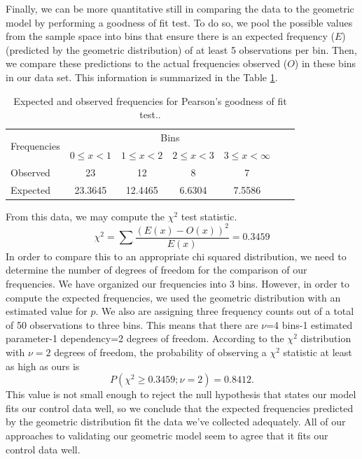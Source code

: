 \documentclass{amsart}
\begin{document}
Finally, we can be more quantitative still in comparing the data to the geometric model by performing a goodness of fit test.  To do so, we pool the possible values from the sample space into bins that ensure there is an expected frequency ($E$) (predicted by the geometric distribution) of at least 5 observations per bin.  Then, we compare these predictions to the actual frequencies observed ($O$) in these bins in our data set.  This information is summarized in the Table \ref{Tbl:chi2}.

\begin{table}
{\footnotesize
\begin{tabular}{lcccccc}
\toprule
\multirow{2}{*}{Frequencies} & \multicolumn{4}{c}{Bins}\\	
	& $0\le x < 1$ &	$1\le x <2$ & 	$2\le x <3$ & $3\le x< \infty$\\
	\midrule
Observed& 23& 12 & 8 & 7\\
Expected & 23.3645 & 12.4465 & 6.6304 & 7.5586 \\
\bottomrule
\end{tabular}}
\caption{Expected and observed frequencies for Pearson's goodness of fit test..\label{Tbl:chi2}}
\end{table}

From this data, we may compute the $\chi^2$ test statistic.
$$\chi^2=\sum\frac{(E(x)-O(x))^2}{E(x)}=0.3459$$
In order to compare this to an appropriate chi squared distribution, we need to determine the number of degrees of freedom for the comparison of our frequencies.  We have organized our frequencies into 3 bins.  However, in order to compute the expected frequencies, we used the geometric distribution with an estimated value for $p$.  We also are assigning three frequency counts out of a total of 50 observations to three bins. This means that there are $\nu$=4 bins-1 estimated parameter-1 dependency=2 degrees of freedom. According to the $\chi^2$ distribution with $\nu=2$ degrees of freedom, the probability of observing a $\chi^2$ statistic at least as high as ours is
$$P(\chi^2\ge 0.3459;\nu=2)=0.8412.$$
This value is not small enough to reject the null hypothesis that states our model fits our control data well, so we conclude that the expected frequencies predicted by the geometric distribution fit the data we've collected adequately. All of our approaches to validating our geometric model seem to agree that it fits our control data well.
\end{document}
